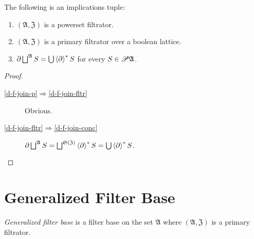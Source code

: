 \begin{cor}
\label{d-f-join}The following is an implications tuple:
\begin{enumerate}
\item \label{d-f-join-p}$(\mathfrak{A},\mathfrak{Z})$ is a powerset filtrator.
\item \label{d-f-join-fltr}$(\mathfrak{A},\mathfrak{Z})$ is a primary
filtrator over a boolean lattice.
\item \label{d-f-join-conc}$\corestar\bigsqcup^{\mathfrak{A}}S=\bigcup\rsupfun{\corestar}S$
for every $S\in\mathscr{P}\mathfrak{A}$.
\end{enumerate}
\end{cor}
\begin{proof}
~
\begin{description}
\item [{\ref{d-f-join-p}$\Rightarrow$\ref{d-f-join-fltr}}] Obvious.
\item [{\ref{d-f-join-fltr}$\Rightarrow$\ref{d-f-join-conc}}] $\corestar\bigsqcup^{\mathfrak{A}}S=\bigsqcup^{\mathfrak{S}(\mathfrak{Z})}\rsupfun{\corestar}S=\bigcup\rsupfun{\corestar}S$.
\end{description}
\end{proof}

\section{Generalized Filter Base}
\begin{defn}
\emph{Generalized filter base} is
a filter base on the set $\mathfrak{A}$ where $(\mathfrak{A},\mathfrak{Z})$
is a primary filtrator.
\end{defn}

